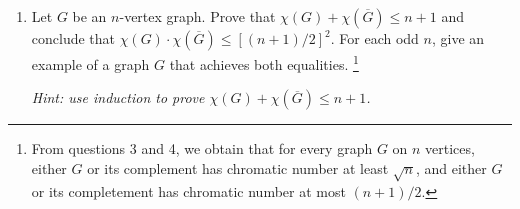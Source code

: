 \documentclass[12pt]{article}
\begin{document}
\begin{enumerate}
\begin{proof}
	
\end{proof}
	
\medskip
	
{\em Hint: using a $\chi(G)$-coloring of $G$ and a $\chi(\overline{G})$-coloring of $\overline{G}$, construct a proper coloring of $K_n$. Also you may find it useful to use the AM-GM inequality which states that if $x$ and $y$ are non-negative real numbers, then $\sqrt{xy} \leq \frac{x+y}{2}$.}
	
\medskip
\item Let $G$ be an $n$-vertex graph. Prove that $\chi(G) + \chi(\overline{G}) \leq n+1$ and conclude that $\chi(G) \cdot \chi(\overline{G}) \leq [(n+1)/2]^2$. For each odd $n$, give an example of a graph $G$ that achieves both equalities.
\footnote{From questions 3 and 4, we obtain that for every graph $G$ on $n$ vertices, either $G$ or its complement has chromatic number at least $\sqrt{n}$, and either $G$ or its completement has chromatic number at most $(n+1)/2$.}
 
\medskip

{\em Hint: use induction to prove $\chi(G) + \chi(\overline{G}) \leq n+1$.}


\end{enumerate}
\end{document}
